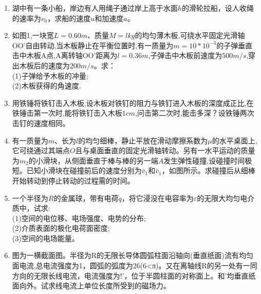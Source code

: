 
\begin{enumerate}
\item 湖中有一条小船，岸边有人用绳子通过岸上高于水面$h$的滑轮拉船，设人收绳的速率为$v_0$，求船的速度$u$和加速度$a$。
\item 如图1,一块宽$L=0.60m$、质量$M=lkg$的均匀薄木板,可绕水平固定光滑轴OO'自由转动,当木板静止在平衡位置时,有一质量为$m=10*10^{-3}$的子弹垂直击中木板A点,A离转轴OO'距离为$l=0.36m$,子弹击中木板前速度为$500m/s$,穿出木板后的速度为$200m/s$。求：\\
(1)子弹给予木板的冲量;\\
(2)木板获得的角速度.
\item 用铁锤将铁钉击入木板,设木板对铁钉的阻力与铁钉进入木板的深度成正比,在铁锤击第一次时,能将铁钉击入木板$1cm$,问击第二次时,能击多深？设铁锤两次击钉的速度相同。
\item 有一质量为$m$、长为$l$的均匀细棒，静止平放在滑动摩擦系数为$\mu$的水平桌面上,它可绕通过其端点$O$且与桌面垂直的固定光滑轴转动。另有一水平运动的质量为$m_2$的小滑块，从侧面垂直于棒与棒的另一端$A$发生弹性碰撞,设碰撞时间极短。已知小滑块在碰撞前后的速度分别为$\bar v_1$和$\bar v_1$，如图所示。求碰撞后从细棒开始转动到停止转动的过程需的时间。
\item 一个半径为$R$的金属球，带有电荷$q$，将它浸没在电容率为$\varepsilon$的无限大均匀电介质中，试求:\\
(1)空间的电位移、电场强度、电势的分布;\\
(2)介质表面的极化电荷面密度;\\
(3)空间的电场能量。
\item 图为一横截面图。半径为R的无限长导体圆弧柱面沿轴向(垂直纸面)流有均匀面电流,总电流强度为1，圆弧的弧度为26(6<π)。又在离轴线R的另一处有一同方向的无限长线电流，电流强度为!’，位于半圆柱面的对称面上。和’均垂直纸面向外。试求线电流上单位长度所受到的磁场力。
\end{enumerate}